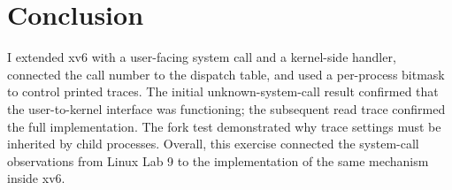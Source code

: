 \documentclass[12pt,a4paper]{article}
\begin{document}
\section{Conclusion}
I extended xv6 with a user-facing system call and a kernel-side handler, connected the call number to the dispatch table, and used a per-process bitmask to control printed traces. The initial unknown-system-call result confirmed that the user-to-kernel interface was functioning; the subsequent read trace confirmed the full implementation. The fork test demonstrated why trace settings must be inherited by child processes. Overall, this exercise connected the system-call observations from Linux Lab 9 to the implementation of the same mechanism inside xv6.
\end{document}
